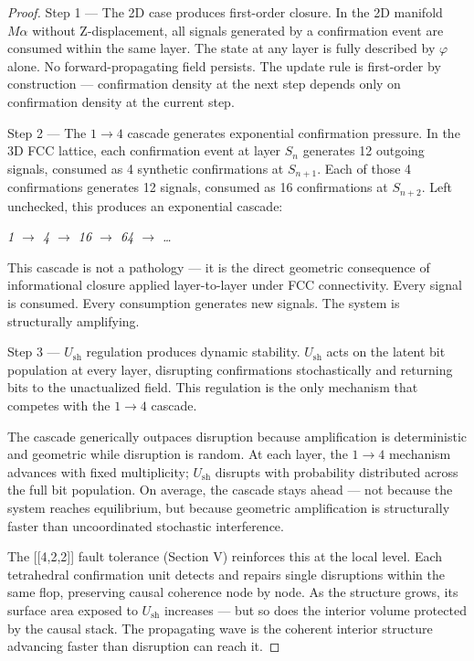 \documentclass[11pt,oneside]{report}
\theoremstyle{definition}
\theoremstyle{remark}
\begin{document}
\begin{proof}


Step 1 --- The 2D case produces first-order closure. In the 2D manifold
\ensuremath{M\alpha} without Z-displacement, all signals generated by a confirmation event
are consumed within the same layer. The state at any layer is fully
described by \ensuremath{\varphi} alone. No forward-propagating field persists. The update
rule is first-order by construction --- confirmation density at the next
step depends only on confirmation density at the current step.

Step 2 --- The \ensuremath{1\to 4} cascade generates exponential confirmation pressure.
In the 3D FCC lattice, each confirmation event at layer \ensuremath{S_{n}} generates 12
outgoing signals, consumed as 4 synthetic confirmations at \ensuremath{S_{n+1}.} Each of
those 4 confirmations generates 12 signals, consumed as 16 confirmations
at \ensuremath{S_{n+2}.} Left unchecked, this produces an exponential cascade:

\emph{1 \ensuremath{\to} 4 \ensuremath{\to} 16 \ensuremath{\to} 64 \ensuremath{\to} \ldots{}}

This cascade is not a pathology --- it is the direct geometric
consequence of informational closure applied layer-to-layer under FCC
connectivity. Every signal is consumed. Every consumption generates new
signals. The system is structurally amplifying.

Step 3 --- \ensuremath{U_{\mathrm{sh}}} regulation produces dynamic stability. \ensuremath{U_{\mathrm{sh}}} acts on the
latent bit population at every layer, disrupting confirmations
stochastically and returning bits to the unactualized field. This
regulation is the only mechanism that competes with the \ensuremath{1\to 4} cascade.

The cascade generically outpaces disruption because amplification is
deterministic and geometric while disruption is random. At each layer,
the \ensuremath{1\to 4} mechanism advances with fixed multiplicity; \ensuremath{U_{\mathrm{sh}}} disrupts with
probability distributed across the full bit population. On average, the
cascade stays ahead --- not because the system reaches equilibrium, but
because geometric amplification is structurally faster than
uncoordinated stochastic interference.

The [[4,2,2]] fault tolerance (Section V) reinforces this at the
local level. Each tetrahedral confirmation unit detects and repairs
single disruptions within the same flop, preserving causal coherence
node by node. As the structure grows, its surface area exposed to \ensuremath{U_{\mathrm{sh}}}
increases --- but so does the interior volume protected by the causal
stack. The propagating wave is the coherent interior structure advancing
faster than disruption can reach it.


\end{proof}
\end{document}
